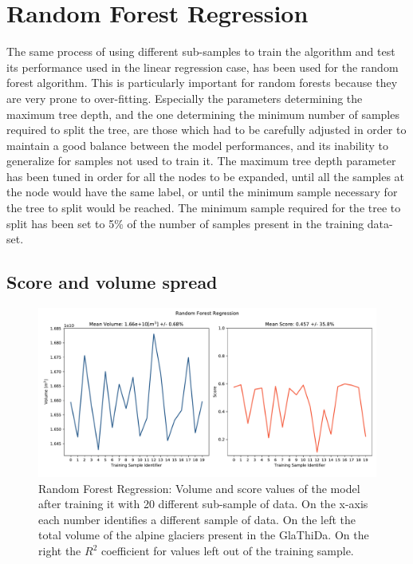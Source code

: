 \section{Random Forest Regression}\label{rfr}
The same process of using different sub-samples to train the algorithm and test its performance used in the linear regression case, has been used for the random forest algorithm. This is particularly important for random forests because they are very prone to over-fitting. Especially the parameters determining the maximum tree depth, and the one determining the minimum number of samples required to split the tree, are those which had to be carefully adjusted in order to maintain a good balance between the model performances, and its inability to generalize for samples not used to train it. The maximum tree depth parameter has been tuned in order for all the nodes to be expanded, until all the samples at the node would have the same label, or until the minimum sample necessary for the tree to split would be reached. The minimum sample required for the tree to split has been set to 5\% of the number of samples present in the training data-set.  

\subsection{Score and volume spread}\label{rfr-score}

\begin{figure}[!tp]
	\centering		  
	\includegraphics[width=1.\textwidth]{figures/RFR_score.pdf}
	\caption{Random Forest Regression: Volume and score values of the model after training it with 20 different sub-sample of data. On the x-axis each number identifies a different sample of data. On the left the total volume of the alpine glaciers present in the GlaThiDa. On the right the $R^2$ coefficient for values left out of the training sample.}
	\label{fig:rfr-score}
\end{figure}

